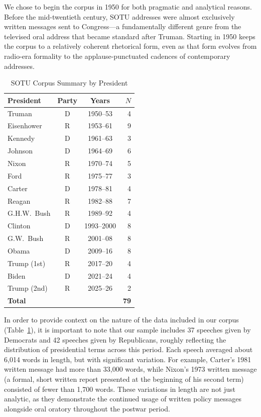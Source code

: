 \documentclass[11pt,twocolumn]{article}
\begin{document}
We chose to begin the corpus in 1950 for both pragmatic and analytical reasons. Before the mid-twentieth century, SOTU addresses were almost exclusively written messages sent to Congress---a fundamentally different genre from the televised oral address that became standard after Truman. Starting in 1950 keeps the corpus to a relatively coherent rhetorical form, even as that form evolves from radio-era formality to the applause-punctuated cadences of contemporary addresses.

\begin{table}[h]
\centering
\small
\caption{SOTU Corpus Summary by President}
\label{tab:corpus}
\begin{tabular}{lccr}
\toprule
\textbf{President} & \textbf{Party} & \textbf{Years} & \textbf{$N$} \\
\midrule
Truman & D & 1950--53 & 4 \\
Eisenhower & R & 1953--61 & 9 \\
Kennedy & D & 1961--63 & 3 \\
Johnson & D & 1964--69 & 6 \\
Nixon & R & 1970--74 & 5 \\
Ford & R & 1975--77 & 3 \\
Carter & D & 1978--81 & 4 \\
Reagan & R & 1982--88 & 7 \\
G.H.W.\ Bush & R & 1989--92 & 4 \\
Clinton & D & 1993--2000 & 8 \\
G.W.\ Bush & R & 2001--08 & 8 \\
Obama & D & 2009--16 & 8 \\
Trump (1st) & R & 2017--20 & 4 \\
Biden & D & 2021--24 & 4 \\
Trump (2nd) & R & 2025--26 & 2 \\
\midrule
\textbf{Total} & & & \textbf{79} \\
\bottomrule
\end{tabular}
\end{table}

In order to provide context on the nature of the data included in our corpus (Table~\ref{tab:corpus}), it is important to note that our sample includes 37 speeches given by Democrats and 42 speeches given by Republicans, roughly reflecting the distribution of presidential terms across this period. Each speech averaged about 6,014 words in length, but with significant variation. For example, Carter's 1981 written message had more than 33,000 words, while Nixon's 1973 written message (a formal, short written report presented at the beginning of his second term) consisted of fewer than 1,700 words. These variations in length are not just analytic, as they demonstrate the continued usage of written policy messages alongside oral oratory throughout the postwar period.
\end{document}

